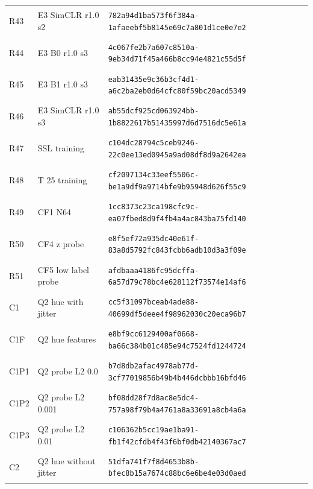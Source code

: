 \begin{longtable}{@{}l>{\raggedright\arraybackslash}p{3.5cm}p{10.8cm}@{}}
\hypertarget{R43}{R43} & E3 SimCLR r1.0 s2 & {\fontsize{8.8}{11}\selectfont\texttt{782a94d1ba573f6f384a-1afaeebf5b8145e69c7a801d1ce0e7e2}} \\
\hypertarget{R44}{R44} & E3 B0 r1.0 s3 & {\fontsize{8.8}{11}\selectfont\texttt{4c067fe2b7a607c8510a-9eb34d71f45a466b8cc94e4821c55d5f}} \\
\hypertarget{R45}{R45} & E3 B1 r1.0 s3 & {\fontsize{8.8}{11}\selectfont\texttt{eab31435e9c36b3cf4d1-a6c2ba2eb0d64cfc80f59bc20acd5349}} \\
\hypertarget{R46}{R46} & E3 SimCLR r1.0 s3 & {\fontsize{8.8}{11}\selectfont\texttt{ab55dcf925cd063924bb-1b8822617b51435997d6d7516dc5e61a}} \\
\hypertarget{R47}{R47} & SSL training & {\fontsize{8.8}{11}\selectfont\texttt{c104dc28794c5ceb9246-22c0ee13ed0945a9ad08df8d9a2642ea}} \\
\hypertarget{R48}{R48} & T 25 training & {\fontsize{8.8}{11}\selectfont\texttt{cf2097134c33eef5506c-be1a9df9a9714bfe9b95948d626f55c9}} \\
\hypertarget{R49}{R49} & CF1 N64 & {\fontsize{8.8}{11}\selectfont\texttt{1cc8373c23ca198cfc9c-ea07fbed8d9f4fb4a4ac843ba75fd140}} \\
\hypertarget{R50}{R50} & CF4 z probe & {\fontsize{8.8}{11}\selectfont\texttt{e8f5ef72a935dc40e61f-83a8d5792fc843fcbb6adb10d3a3f09e}} \\
\hypertarget{R51}{R51} & CF5 low label probe & {\fontsize{8.8}{11}\selectfont\texttt{afdbaaa4186fc95dcffa-6a57d79c78bc4e628112f73574e14af6}} \\
\hypertarget{C1}{C1} & Q2 hue with jitter & {\fontsize{8.8}{11}\selectfont\texttt{cc5f31097bceab4ade88-40699df5deee4f98962030c20eca96b7}} \\
\hypertarget{C1F}{C1F} & Q2 hue features & {\fontsize{8.8}{11}\selectfont\texttt{e8bf9cc6129400af0668-ba66c384b01c485e94c7524fd1244724}} \\
\hypertarget{C1P1}{C1P1} & Q2 probe L2 0.0 & {\fontsize{8.8}{11}\selectfont\texttt{b7d8db2afac4978ab77d-3cf77019856b49b4b446dcbbb16bfd46}} \\
\hypertarget{C1P2}{C1P2} & Q2 probe L2 0.001 & {\fontsize{8.8}{11}\selectfont\texttt{bf08dd28f7d8ac8e5dc4-757a98f79b4a4761a8a33691a8cb4a6a}} \\
\hypertarget{C1P3}{C1P3} & Q2 probe L2 0.01 & {\fontsize{8.8}{11}\selectfont\texttt{c106362b5cc19ae1ba91-fb1f42cfdb4f43f6bf0db42140367ac7}} \\
\hypertarget{C2}{C2} & Q2 hue without jitter & {\fontsize{8.8}{11}\selectfont\texttt{51dfa741f7f8d4653b8b-bfec8b15a7674c88bc6e6be4e03d0aed}} \\

\end{longtable}
